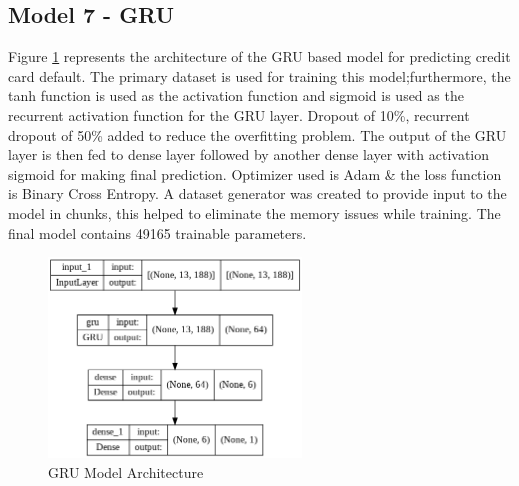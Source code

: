 \documentclass[twoside,11pt,a4paper]{article}
\begin{document}
\subsection{Model 7 - \acf{GRU}}
Figure \ref{fig:gru_arch} represents the architecture of the GRU based model for predicting credit card default. The primary dataset is used for training this model;furthermore, the tanh function is used as the activation function and sigmoid  is used as the recurrent activation function  for the GRU layer. Dropout of 10\%, recurrent dropout of 50\% added to reduce the overfitting problem. The output of the GRU layer is then fed to dense layer followed by another dense layer with activation sigmoid for making final prediction. Optimizer used is Adam \& the loss function is Binary Cross Entropy. A dataset generator was created to provide input to the model in chunks, this helped to eliminate the memory issues while training. The final model contains 49165 trainable parameters.\\

\begin{figure}[ht]
	\centering
	\includegraphics[width=0.6\textwidth, height=0.3\textheight]{gru_arch}
	\caption[GRU Model Architecture]{GRU Model Architecture\\}
	\label{fig:gru_arch}
\end{figure}
\end{document}
